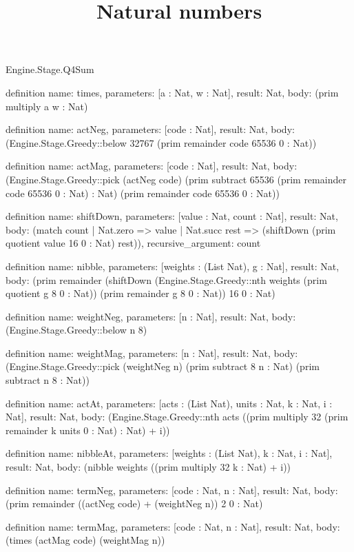 \begin{lexlean}{Engine.Stage.Q4Sum}
\title{Natural numbers}
\begin{semanticmodule}
definition{
  name: times,
  parameters: [a : Nat, w : Nat],
  result: Nat,
  body: (prim multiply a w : Nat)
}

definition{
  name: actNeg,
  parameters: [code : Nat],
  result: Nat,
  body: (Engine.Stage.Greedy::below 32767 (prim remainder code 65536 0 : Nat))
}

definition{
  name: actMag,
  parameters: [code : Nat],
  result: Nat,
  body: (Engine.Stage.Greedy::pick (actNeg code) (prim subtract 65536 (prim remainder code 65536 0 : Nat) : Nat) (prim remainder code 65536 0 : Nat))
}

definition{
  name: shiftDown,
  parameters: [value : Nat, count : Nat],
  result: Nat,
  body: (match count
    | Nat.zero => value
    | Nat.succ rest => (shiftDown (prim quotient value 16 0 : Nat) rest)),
  recursive_argument: count
}

definition{
  name: nibble,
  parameters: [weights : (List Nat), g : Nat],
  result: Nat,
  body: (prim remainder (shiftDown (Engine.Stage.Greedy::nth weights (prim quotient g 8 0 : Nat)) (prim remainder g 8 0 : Nat)) 16 0 : Nat)
}

definition{
  name: weightNeg,
  parameters: [n : Nat],
  result: Nat,
  body: (Engine.Stage.Greedy::below n 8)
}

definition{
  name: weightMag,
  parameters: [n : Nat],
  result: Nat,
  body: (Engine.Stage.Greedy::pick (weightNeg n) (prim subtract 8 n : Nat) (prim subtract n 8 : Nat))
}

definition{
  name: actAt,
  parameters: [acts : (List Nat), units : Nat, k : Nat, i : Nat],
  result: Nat,
  body: (Engine.Stage.Greedy::nth acts ((prim multiply 32 (prim remainder k units 0 : Nat) : Nat) + i))
}

definition{
  name: nibbleAt,
  parameters: [weights : (List Nat), k : Nat, i : Nat],
  result: Nat,
  body: (nibble weights ((prim multiply 32 k : Nat) + i))
}

definition{
  name: termNeg,
  parameters: [code : Nat, n : Nat],
  result: Nat,
  body: (prim remainder ((actNeg code) + (weightNeg n)) 2 0 : Nat)
}

definition{
  name: termMag,
  parameters: [code : Nat, n : Nat],
  result: Nat,
  body: (times (actMag code) (weightMag n))
}


\end{semanticmodule}
\end{lexlean}
